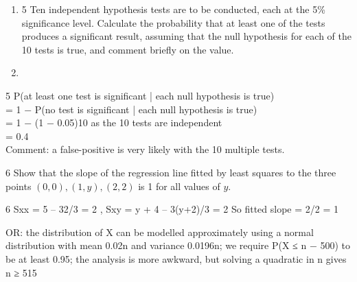 \documentclass[a4paper,12pt]{article}
\begin{document}
\begin{enumerate}
\item
5 Ten independent hypothesis tests are to be conducted, each at the 5\% significance
level.
Calculate the probability that at least one of the tests produces a significant result,
assuming that the null hypothesis for each of the 10 tests is true, and comment briefly
on the value. 
\item 

\end{enumerate}
\newpage

5 P(at least one test is significant | each null hypothesis is true)\\
= 1 − P(no test is significant | each null hypothesis is true)\\
= 1 − (1 − 0.05)10 as the 10 tests are independent\\
= 0.4\\

Comment: a false-positive is very likely with the 10 multiple tests.

6 Show that the slope of the regression line fitted by least squares to the three points
$(0,0) , (1,y) , (2,2)$
is 1 for all values of $y$. 

6 Sxx = 5 – 32/3 = 2 , Sxy = y + 4 – 3(y+2)/3 = 2
So fitted slope = 2/2 = 1

OR: the distribution of X can be modelled approximately using a normal distribution
with mean 0.02n and variance 0.0196n; we require P(X ≤ n − 500) to be at least 0.95;
the analysis is more awkward, but solving a quadratic in n gives n ≥ 515
\end{document}
